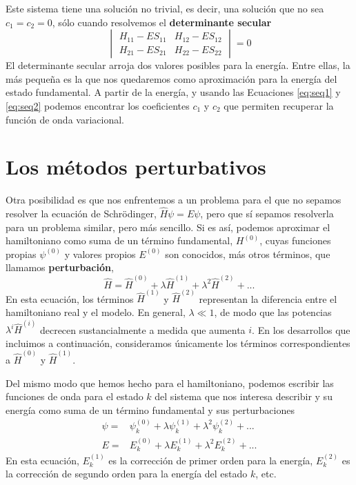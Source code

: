 Este sistema tiene una solución no trivial, es decir,
una solución que no sea $c_1=c_2=0$, sólo cuando resolvemos 
el \textbf{determinante secular}
\begin{equation}
\begin{vmatrix}
 H_{11}-ES_{11} &  H_{12}-ES_{12}  \\ 
 H_{21}-ES_{21} &  H_{22}-ES_{22}
\end{vmatrix}= 0
\end{equation}
El determinante secular arroja dos valores posibles
para la energía. Entre ellas, la más pequeña es 
la que nos quedaremos como aproximación para la energía
del estado fundamental. A partir de la energía, y usando
las Ecuaciones \ref{eq:seq1} y \ref{eq:seq2} podemos
encontrar los coeficientes $c_1$ y $c_2$ que permiten
recuperar la función de onda variacional.

\section{Los métodos perturbativos}
Otra posibilidad es que nos enfrentemos a un problema 
para el que no sepamos resolver la ecuación de Schrödinger,
$\hat{H}\psi=E\psi$, pero que sí sepamos resolverla para
un problema similar, pero más sencillo.
Si es así, podemos aproximar el hamiltoniano como suma 
de un término fundamental, $H^{(0)}$, cuyas funciones propias 
$\psi^{(0)}$ y valores propios $E^{(0)}$ son conocidos,
más otros términos, que llamamos \textbf{perturbación}, 
\begin{equation}
    \hat{H}=\hat{H}^{(0)} + \lambda\hat{H}^{(1)} + 
    \lambda^2 \hat{H}^{(2)} + ...
    \label{eq:H_pert}
\end{equation}
En esta ecuación, los términos $\hat{H}^{(1)}$ y 
$\hat{H}^{(2)}$ representan la diferencia entre el
hamiltoniano real y el modelo. En general,
$\lambda \ll 1$, de modo que las potencias
$\lambda^i\hat{H}^{(i)}$ decrecen sustancialmente 
a medida que aumenta $i$. En los desarrollos que 
incluimos a continuación, consideramos únicamente los
términos correspondientes a $\hat{H}^{(0)}$ y 
$\hat{H}^{(1)}$.

Del mismo modo que hemos hecho para el hamiltoniano, 
podemos escribir las funciones de onda para el estado $k$
del sistema que nos interesa describir y su energía 
como suma de un término fundamental y sus perturbaciones
\begin{align}
    \psi =& \psi_k^{(0)} + \lambda\psi_k^{(1)} + \lambda^2\psi_k^{(2)} + ... \label{eq:psi_pert}\\
    E =& E_k^{(0)} + \lambda E_k^{(1)} + \lambda^2E_k^{(2)}+ ...
    \label{eq:E_pert}
\end{align}
En esta ecuación, $E_k^{(1)}$ es la corrección de primer orden
para la energía,  $E_k^{(2)}$ es la corrección de segundo orden 
para la energía del
estado $k$, etc. 

